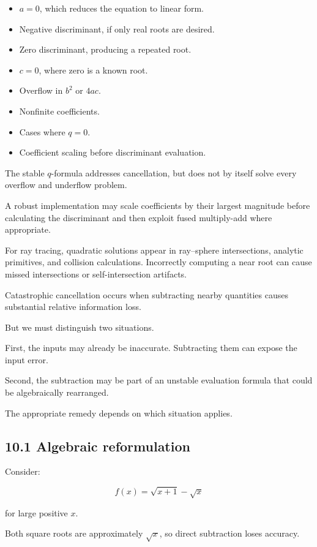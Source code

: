 \begin{itemize}
\tightlist
\item
  \(a=0\), which reduces the equation to linear form.
\item
  Negative discriminant, if only real roots are desired.
\item
  Zero discriminant, producing a repeated root.
\item
  \(c=0\), where zero is a known root.
\item
  Overflow in \(b^2\) or \(4ac\).
\item
  Nonfinite coefficients.
\item
  Cases where \(q=0\).
\item
  Coefficient scaling before discriminant evaluation.
\end{itemize}

The stable \(q\)-formula addresses cancellation, but does not by itself solve every overflow and underflow problem.

A robust implementation may scale coefficients by their largest magnitude before calculating the discriminant and then exploit fused multiply-add where appropriate.

For ray tracing, quadratic solutions appear in ray--sphere intersections, analytic primitives, and collision calculations. Incorrectly computing a near root can cause missed intersections or self-intersection artifacts.

Catastrophic cancellation occurs when subtracting nearby quantities causes substantial relative information loss.

But we must distinguish two situations.

First, the inputs may already be inaccurate. Subtracting them can expose the input error.

Second, the subtraction may be part of an unstable evaluation formula that could be algebraically rearranged.

The appropriate remedy depends on which situation applies.

\subsection{10.1 Algebraic reformulation}\label{02-foundations-ii-ch028-algebraic-reformulation}

Consider:

\[ f(x)=\sqrt{x+1}-\sqrt x \]

for large positive \(x\).

Both square roots are approximately \(\sqrt x\), so direct subtraction loses accuracy.

